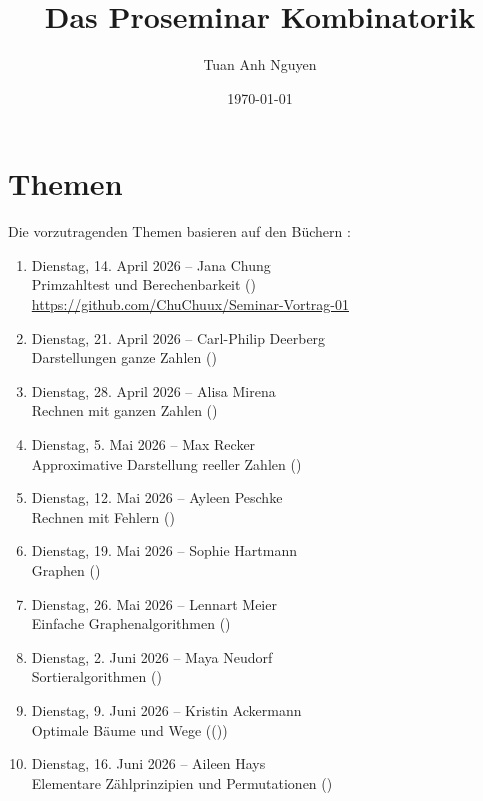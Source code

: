 \documentclass{article}
\title{Das Proseminar Kombinatorik}
\author{Tuan Anh Nguyen}
\date{\today}
\begin{document}
\maketitle
\section{Themen}
Die vorzutragenden Themen basieren auf den Büchern \cite{aigner2006diskrete,hougardy2018algorithmische}:
\begin{enumerate}
    \item Dienstag, 14. April 2026 -- Jana Chung \\ Primzahltest und Berechenbarkeit (\cite[Kapitel 1]{hougardy2018algorithmische})\\\url{https://github.com/ChuChuux/Seminar-Vortrag-01}
    \item Dienstag, 21. April 2026 -- Carl-Philip Deerberg\\
	Darstellungen ganze Zahlen (\cite[Kapitel 2]{hougardy2018algorithmische})
    \item Dienstag, 28. April 2026 -- Alisa Mirena\\Rechnen mit ganzen Zahlen (\cite[Kapitel 3]{hougardy2018algorithmische})
    \item Dienstag, 5. Mai 2026 -- Max Recker\\Approximative Darstellung reeller Zahlen (\cite[Kapitel 4]{hougardy2018algorithmische})
    \item Dienstag, 12. Mai 2026 -- Ayleen Peschke\\Rechnen mit Fehlern (\cite[Kapitel 5]{hougardy2018algorithmische})
    \item Dienstag, 19. Mai 2026 -- Sophie Hartmann\\Graphen (\cite[Kapitel 6]{hougardy2018algorithmische})
    \item Dienstag, 26. Mai 2026 -- Lennart Meier\\Einfache Graphenalgorithmen (\cite[Kapitel 7]{hougardy2018algorithmische})
    \item Dienstag, 2. Juni 2026 -- Maya Neudorf\\Sortieralgorithmen (\cite[Kapitel 8]{hougardy2018algorithmische})
    \item Dienstag, 9. Juni 2026 --  Kristin Ackermann\\Optimale Bäume und Wege ((\cite[Kapitel 9]{hougardy2018algorithmische}))    
    \item Dienstag, 16. Juni 2026 -- Aileen Hays \\Elementare Zählprinzipien und Permutationen (\cite[Abschnitte 1.1--1.3]{aigner2006diskrete})

\end{enumerate}
\end{document}
